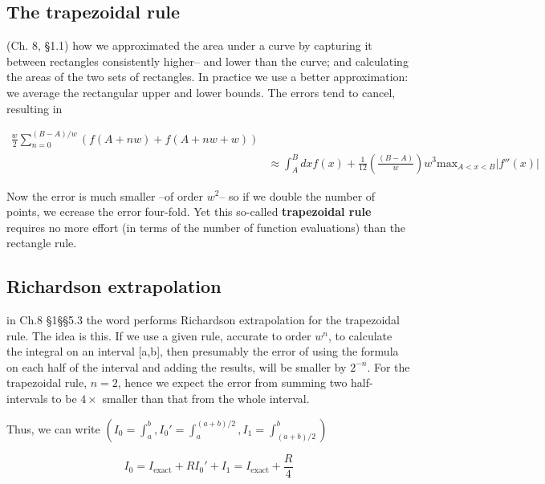 \subsection{The trapezoidal rule}

 (Ch. 8, \S1.1) how we approximated the area under a curve by capturing it between rectangles consistently higher-- and lower than the curve; and calculating the areas of the two sets of rectangles. In practice we use a better approximation: we average the rectangular upper and lower bounds. The errors tend to
cancel, resulting in

\begin{equation}
  \begin{split}
    \frac{w}{2} \sum_{n=0}^{(B-A)/w} \left( f(A+nw) + f(A+nw+w)\right) \\
    & \approx \int_{A}^{B} dx f(x) + \frac{1}{12} \left( \frac{(B-A)}{w} \right) w^{3} \text{max}_{A<x<B} \vert f''(x) \vert
  \end{split}
\end{equation}

Now the error is much smaller --of order $w^{2}$-- so if we double the number of points, we ecrease the error four-fold. Yet this so-called \textbf{trapezoidal rule} requires no more effort (in terms of the number of function evaluations) than the rectangle rule.


\subsection{Richardson extrapolation}
  in Ch.8 \S1\S\S5.3 the word  performs Richardson extrapolation for the trapezoidal rule. The idea is this. If we use a given rule, accurate to order $w^{n}$, to calculate the integral on an interval [a,b], then presumably the error of using the formula on each half of the interval and adding the results, will be smaller by $2^{-n}$. For the trapezoidal rule, $n = 2$, hence we expect the error from summing two half-intervals to be $4\times$ smaller than that from the whole interval.

Thus, we can write $(I_{0} = \int_{a}^{b} , I_{0}' = \int_{a}^{(a+b)/2}, I_{1} = \int_{(a+b)/2}^{b})$

\begin{subequations}
    \begin{equation}\label{eq:08_52a}
        I_{0} = I_{\text{exact}} + R
    \end{equation}
    \begin{equation}\label{eq:08_52b}
        I_{0}' + I_{1} = I_{\text{exact}} + \frac{R}{4}
    \end{equation}
\end{subequations}

